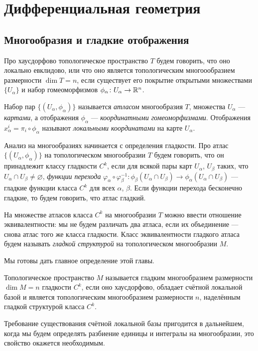 \section{Дифференциальная геометрия}
\subsection{Многообразия и гладкие отображения}
\begin{defin}
	Про хаусдорфово топологическое пространство $T$ будем говорить, что оно локально евклидово, или что оно является топологическим многоообразием размерности $\dim T=n$, если существует его покрытие открытыми множествами $\{U_{\alpha}\}$ и набор гомеоморфизмов $\phi_{\alpha}\colon U_{\alpha}\to \mathbb {R}^n$.
\end{defin}
Набор пар $\{(U_{\alpha},\phi_{\alpha})\}$ называется \textit{атласом} многообразия $T$, множества $U_{\alpha}$ --- \textit{картами}, а отображения $\phi_{\alpha}$ --- \textit{координатными гомеоморфизмами}. Отображения $x_{\alpha}^i=\pi_i\circ\phi_{\alpha}$ называют \textit{локальными координатами} на карте $U_{\alpha}$.

Анализ на многообразиях начинается с определения гладкости. Про атлас $\{(U_{\alpha},\phi_{\alpha})\}$ на топологическом многообразии $T$ будем говорить, что он принадлежит классу гладкости $C^k$, если для всякой пары карт $U_{\alpha}$, $U_{\beta}$ таких, что $U_{\alpha}\cap U_{\beta}\neq\varnothing$, \textit{функции перехода} $\varphi_{\alpha}\circ\varphi_{\beta}^{-1}\colon \phi_{\beta}(U_{\alpha}\cap U_{\beta})\to\phi_{\alpha}(U_{\alpha}\cap U_{\beta})$ --- гладкие функции класса $C^k$ для всех $\alpha$, $\beta$. Если функции перехода бесконечно гладкие, то будем говорить, что атлас гладкий.

На множестве атласов класса $C^k$ на многообразии $T$ можно ввести отношение эквивалентности: мы не будем различать два атласа, если их объединение --- снова атлас того же класса гладкости. Класс эквивалентности гладкого атласа будем называть \textit{гладкой структурой} на топологическом многообразии $M$.

Мы готовы дать главное определение этой главы.  
\begin{defin}
	Топологическое пространство $M$ называется гладким многообразием размерности $\dim M=n$ гладкости $C^k$, если оно хаусдорфово, обладает счётной локальной базой и является топологическим многообразием размерности $n$, наделённым гладкой структурой класса $C^k$.
\end{defin}
Требование существования счётной локальной базы пригодится в дальнейшем, когда мы будем определять разбиение единицы и интегралы на многообразии, это свойство окажется необходимым.

